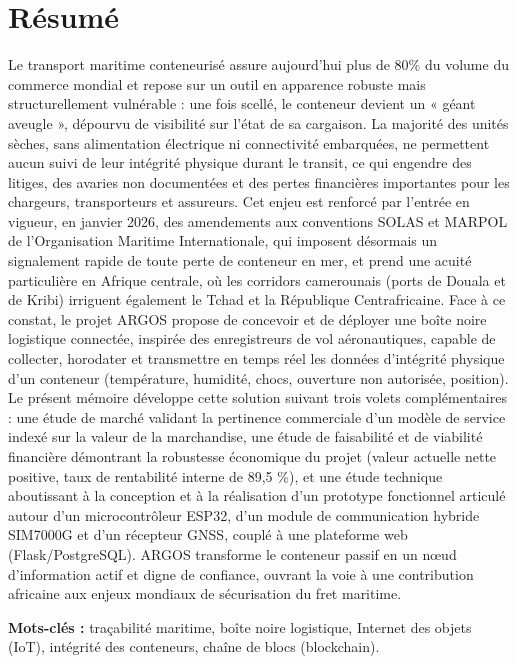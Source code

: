 \chapter*{Résumé}


Le transport maritime conteneurisé assure aujourd'hui plus de 80\% du volume du commerce mondial et repose sur un outil en apparence robuste mais structurellement vulnérable : une fois scellé, le conteneur devient un « géant aveugle », dépourvu de visibilité sur l'état de sa cargaison. La majorité des unités sèches, sans alimentation électrique ni connectivité embarquées, ne permettent aucun suivi de leur intégrité physique durant le transit, ce qui engendre des litiges, des avaries non documentées et des pertes financières importantes pour les chargeurs, transporteurs et assureurs. Cet enjeu est renforcé par l'entrée en vigueur, en janvier 2026, des amendements aux conventions SOLAS et MARPOL de l'Organisation Maritime Internationale, qui imposent désormais un signalement rapide de toute perte de conteneur en mer, et prend une acuité particulière en Afrique centrale, où les corridors camerounais (ports de Douala et de Kribi) irriguent également le Tchad et la République Centrafricaine.
Face à ce constat, le projet ARGOS propose de concevoir et de déployer une boîte noire logistique connectée, inspirée des enregistreurs de vol aéronautiques, capable de collecter, horodater et transmettre en temps réel les données d'intégrité physique d'un conteneur (température, humidité, chocs, ouverture non autorisée, position). Le présent mémoire développe cette solution suivant trois volets complémentaires : une étude de marché validant la pertinence commerciale d'un modèle de service indexé sur la valeur de la marchandise, une étude de faisabilité et de viabilité financière démontrant la robustesse économique du projet (valeur actuelle nette positive, taux de rentabilité interne de 89,5 \%), et une étude technique aboutissant à la conception et à la réalisation d'un prototype fonctionnel articulé autour d'un microcontrôleur ESP32, d'un module de communication hybride SIM7000G et d'un récepteur GNSS, couplé à une plateforme web (Flask/PostgreSQL).
ARGOS transforme le conteneur passif en un nœud d'information actif et digne de confiance, ouvrant la voie à une contribution africaine aux enjeux mondiaux de sécurisation du fret maritime.
\vspace{1cm}\noindent 

\textbf{Mots-clés :} traçabilité maritime, boîte noire logistique, Internet des objets (IoT), intégrité des conteneurs, chaîne de blocs (blockchain).

